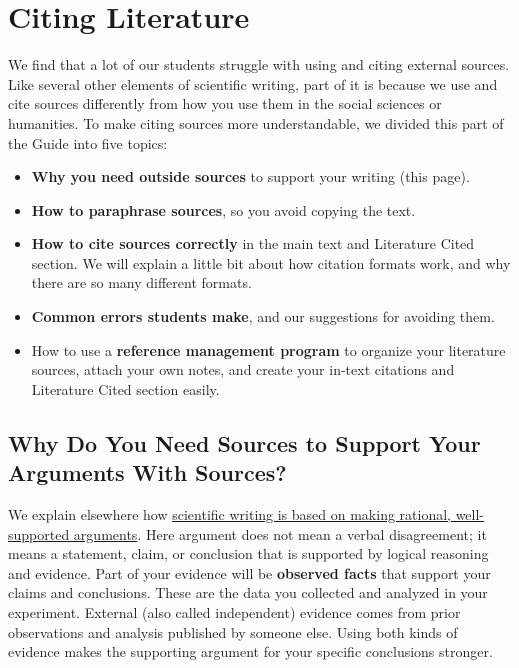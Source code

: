 \documentclass[
]{book}
\providecommand{\tightlist}{%
  \setlength{\itemsep}{0pt}\setlength{\parskip}{0pt}}
\begin{document}
\hypertarget{sources500}{%
\chapter{Citing Literature}\label{sources500}}

We find that a lot of our students struggle with using and citing external sources. Like several other elements of scientific writing, part of it is because we use and cite sources differently from how you use them in the social sciences or humanities. To make citing sources more understandable, we divided this part of the Guide into five topics:

\begin{itemize}
\tightlist
\item
  \textbf{Why you need outside sources} to support your writing (this page).
\item
  \textbf{How to paraphrase sources}, so you avoid copying the text.
\item
  \textbf{How to cite sources correctly} in the main text and Literature Cited section. We will explain a little bit about how citation formats work, and why there are so many different formats.
\item
  \textbf{Common errors students make}, and our suggestions for avoiding them.
\item
  How to use a \textbf{reference management program} to organize your literature sources, attach your own notes, and create your in-text citations and Literature Cited section easily.
\end{itemize}

\hypertarget{why-do-you-need-sources-to-support-your-arguments-with-sources}{%
\section{Why Do You Need Sources to Support Your Arguments With Sources?}\label{why-do-you-need-sources-to-support-your-arguments-with-sources}}

We explain elsewhere how \protect\hyperlink{toulmin615}{scientific writing is based on making rational, well-supported arguments}. Here argument does not mean a verbal disagreement; it means a statement, claim, or conclusion that is supported by logical reasoning and evidence. Part of your evidence will be \textbf{observed facts} that support your claims and conclusions. These are the data you collected and analyzed in your experiment. External (also called independent) evidence comes from prior observations and analysis published by someone else. Using both kinds of evidence makes the supporting argument for your specific conclusions stronger.
\end{document}
